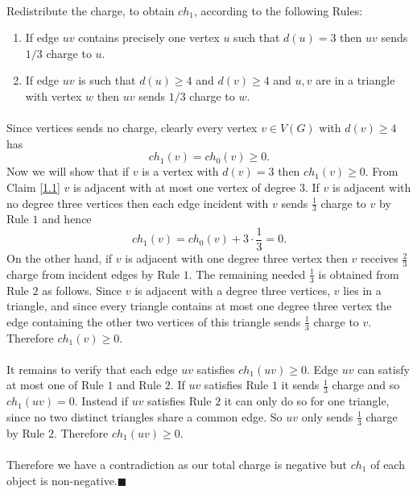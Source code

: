 \documentclass[letterpaper,12pt,oneside,onecolumn]{article}
\begin{document}
\paragraph{}
Redistribute the charge, to obtain $ch_1$, according to the following Rules:
\begin{enumerate}
	\item If edge $uv$ contains precisely one vertex $u$ such that $d(u) = 3$ then $uv$ sends $1/3$ charge to $u$.
	\item If edge $uv$ is such that $d(u) \geq 4$ and $d(v) \geq 4$ and $u,v$ are in a triangle with vertex $w$ then $uv$ sends $1/3$ charge to $w$.
\end{enumerate}
\paragraph{}
Since vertices sends no charge, clearly every vertex $v \in V(G)$ with $d(v) \geq 4$ has $$ch_1(v) = ch_0(v) \geq 0.$$ Now we will show that if $v$ is a vertex with $d(v) = 3$ then $ch_1(v) \geq 0$. From Claim \ref{1.1} $v$ is adjacent with at most one vertex of degree $3$. If $v$ is adjacent with no degree three vertices then each edge incident with $v$ sends $\frac{1}{3}$ charge to $v$ by Rule $1$ and hence
$$ch_1(v) = ch_0(v) + 3\cdot\frac{1}{3} = 0.$$
On the other hand, if $v$ is adjacent with one degree three vertex then $v$ receives $\frac{2}{3}$ charge from incident edges by Rule $1$. The remaining needed $\frac{1}{3}$ is obtained from Rule $2$ as follows. Since $v$ is adjacent with a degree three vertices, $v$ lies in a triangle, and since every triangle contains at most one degree three vertex the edge containing the other two vertices of this triangle sends $\frac{1}{3}$ charge to $v$. Therefore $ch_1(v) \geq 0$.
\paragraph{}
It remains to verify that each edge $uv$ satisfies $ch_1(uv) \geq 0$. Edge $uv$ can satisfy at most one of Rule $1$ and Rule $2$. If $uv$ satisfies Rule $1$ it sends $\frac{1}{3}$ charge and so $ch_1(uv) = 0$. Instead if $uv$ satisfies Rule $2$ it can only do so for one triangle, since no two distinct triangles share a common edge. So $uv$ only sends $\frac{1}{3}$ charge by Rule $2$. Therefore $ch_1(uv) \geq 0$.
\paragraph{}
Therefore we have a contradiction as our total charge is negative but $ch_1$ of each object is non-negative.$\blacksquare$
\end{document}
